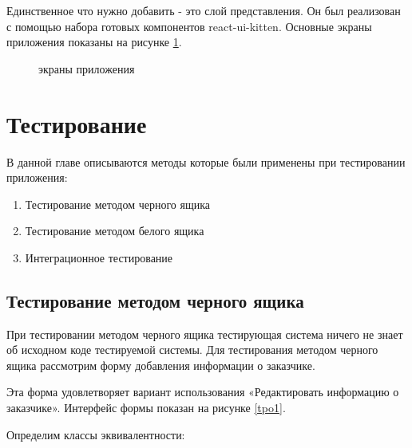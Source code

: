 \documentclass[a4paper,article,14pt]{extarticle}
\begin{document}
Единственное что нужно добавить - это слой представления. Он был реализован с помощью набора готовых компонентов
react-ui-kitten. Основные экраны приложения показаны на рисунке \ref{mobile}.

\begin{figure}[ht]
\begin{center}
\caption{\label{mobile} экраны приложения}
\end {center}
\end {figure}
\pagebreak

\section{Тестирование}
В данной главе описываются методы которые были применены при  тестировании приложения:

\begin{enumerate}
    \item Тестирование методом черного ящика
    \item Тестирование методом белого ящика
    \item Интеграционное тестирование
\end{enumerate}

\subsection{Тестирование методом черного ящика}

При тестировании методом черного ящика тестирующая система ничего не знает об исходном коде тестируемой системы.
Для тестирования методом черного ящика рассмотрим форму добавления информации о заказчике. 

Эта форма удовлетворяет вариант использования «Редактировать информацию о
заказчике». Интерфейс формы показан на рисунке \ref{tpo1}.

Определим классы эквивалентности:
\end{document}
